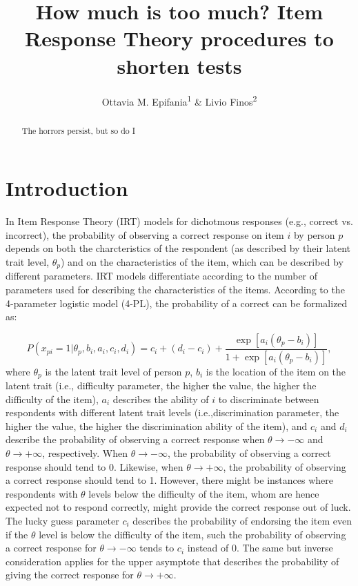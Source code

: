 \documentclass[12pt, a4paper, titilepage]{article}
\title{How much is too much? Item Response Theory procedures to shorten tests}
\author{Ottavia M. Epifania\textsuperscript{1} \& Livio Finos\textsuperscript{2}}
\begin{document}
\maketitle

\begin{abstract}
The horrors persist, but so do I
\end{abstract}

\section{Introduction}

In Item Response Theory (IRT) models for dichotmous responses (e.g., correct vs. incorrect), the probability of observing a correct response on item $i$ by person $p$ depends on both the charcteristics of the respondent (as described by their latent trait level, $\theta_p$) and on the characteristics of the item, which can be described by different parameters. IRT models differentiate according to the number of parameters used for describing the characteristics of the items. According to the 4-parameter logistic model (4-PL), the probability of a correct can be formalized as: 

\begin{equation}
	P(x_{pi}= 1| \theta_p, b_i, a_i, c_i, d_i) = c_i + (d_i -c_i) + \dfrac{\exp[a_i(\theta_p - b_i)]}{1 + \exp[a_i(\theta_p - b_i)]},
\end{equation}
where $\theta_p$ is the latent trait level of person $p$, $b_i$ is the location of the item on the latent trait (i.e., difficulty parameter, the higher the value, the higher the difficulty of the item), $a_i$ describes the ability of $i$ to discriminate between respondents with different latent trait levels (i.e.,discrimination parameter, the higher the value, the higher the discrimination ability of the item), and $c_i$ and $d_i$ describe the probability of observing a correct response when $\theta \rightarrow - \infty$ and $\theta \rightarrow +\infty$, respectively. 
When $\theta \rightarrow - \infty$, the probability of observing a correct response should tend to 0. Likewise, when $\theta \rightarrow +\infty$, the probability of observing a correct response should tend to 1. 
However, there might be instances where respondents with $\theta$ levels below the difficulty of the item, whom are hence expected not to respond correctly, might provide the correct response out of luck. The lucky guess parameter $c_i$ describes the probability of endorsing the item even if the $\theta$ level is below the difficulty of the item, such the probability of observing a correct response for $\theta \rightarrow - \infty$ tends to $c_i$ instead of 0. 
The same but inverse consideration applies for the upper asymptote that describes the probability of giving the correct response for $\theta \rightarrow + \infty$. 
\end{document}
